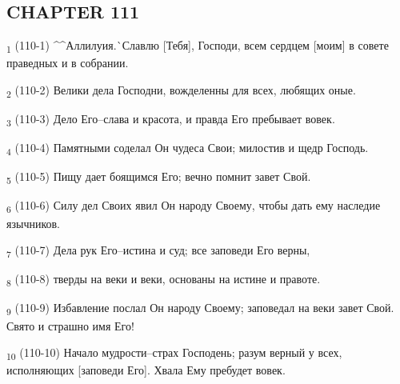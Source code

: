 \subsection{CHAPTER 111}
\begin{tcolorbox}
\textsubscript{1} (110-1) ^^Аллилуия.^^ Славлю [Тебя], Господи, всем сердцем [моим] в совете праведных и в собрании.
\end{tcolorbox}
\begin{tcolorbox}
\textsubscript{2} (110-2) Велики дела Господни, вожделенны для всех, любящих оные.
\end{tcolorbox}
\begin{tcolorbox}
\textsubscript{3} (110-3) Дело Его--слава и красота, и правда Его пребывает вовек.
\end{tcolorbox}
\begin{tcolorbox}
\textsubscript{4} (110-4) Памятными соделал Он чудеса Свои; милостив и щедр Господь.
\end{tcolorbox}
\begin{tcolorbox}
\textsubscript{5} (110-5) Пищу дает боящимся Его; вечно помнит завет Свой.
\end{tcolorbox}
\begin{tcolorbox}
\textsubscript{6} (110-6) Силу дел Своих явил Он народу Своему, чтобы дать ему наследие язычников.
\end{tcolorbox}
\begin{tcolorbox}
\textsubscript{7} (110-7) Дела рук Его--истина и суд; все заповеди Его верны,
\end{tcolorbox}
\begin{tcolorbox}
\textsubscript{8} (110-8) тверды на веки и веки, основаны на истине и правоте.
\end{tcolorbox}
\begin{tcolorbox}
\textsubscript{9} (110-9) Избавление послал Он народу Своему; заповедал на веки завет Свой. Свято и страшно имя Его!
\end{tcolorbox}
\begin{tcolorbox}
\textsubscript{10} (110-10) Начало мудрости--страх Господень; разум верный у всех, исполняющих [заповеди Его]. Хвала Ему пребудет вовек.
\end{tcolorbox}
